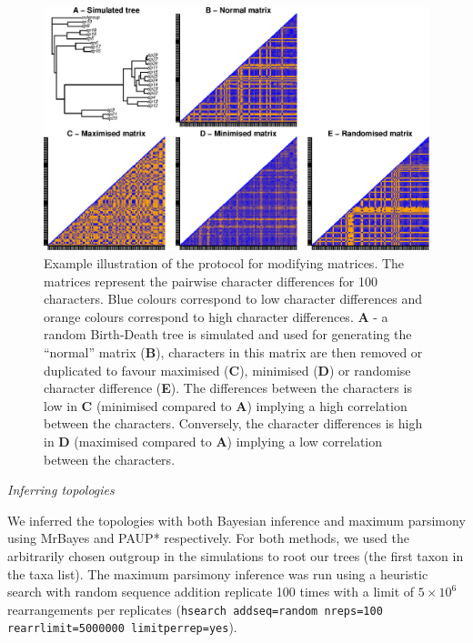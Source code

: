 \documentclass[12pt,letterpaper]{article}
\renewcommand{\subsection}[1]{%
\bigskip
\begin{center}
\begin{large}
\normalfont\itshape #1
\end{large}
\end{center}}
\begin{document}
\begin{figure}[!htbp]
\centering
   \includegraphics[width=1\textwidth]{Modif_matrix.eps}
\caption{Example illustration of the protocol for modifying matrices. The matrices represent the pairwise character differences for 100 characters. Blue colours correspond to low character differences and orange colours correspond to high character differences. \textbf{A} - a random Birth-Death tree is simulated and used for generating the ``normal'' matrix (\textbf{B}), characters in this matrix are then removed or duplicated to favour maximised (\textbf{C}), minimised (\textbf{D}) or randomise character difference (\textbf{E}). The differences between the characters is low in \textbf{C} (minimised compared to \textbf{A}) implying a high correlation between the characters. Conversely, the character differences is high in \textbf{D} (maximised compared to \textbf{A}) implying a low correlation between the characters.}
\label{Fig:modif_matrix}
\end{figure}

\subsection{Inferring topologies}
We inferred the topologies with both Bayesian inference and maximum parsimony using MrBayes \citep[v3.2.6;][]{Ronquist2012mrbayes} and PAUP* \citep[v4.0a151;][]{swofford2001paup} respectively.
For both methods, we used the arbitrarily chosen outgroup in the simulations to root our trees (the first taxon in the taxa list).
The maximum parsimony inference was run using a heuristic search with random sequence addition replicate 100 times with a limit of $5\times10^6$ rearrangements per replicates (\texttt{hsearch addseq=random nreps=100 rearrlimit=5000000 limitperrep=yes}).
\end{document}
